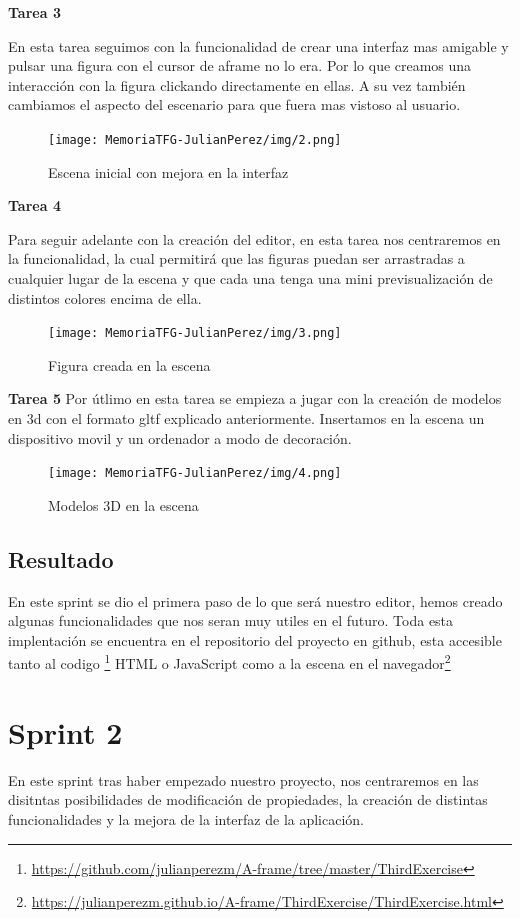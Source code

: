 \documentclass[a4paper, 12pt]{book}
\begin{document}
\textbf{Tarea 3}

En esta tarea seguimos con la funcionalidad de crear una interfaz mas amigable y pulsar una figura con el cursor de aframe no lo era. Por lo que creamos una interacción con la figura clickando directamente en ellas. A su vez también cambiamos el aspecto del escenario para que fuera mas vistoso al usuario.
         \begin{figure}[H]
  \centering
  \texttt{[image: MemoriaTFG-JulianPerez/img/2.png]}
  \caption{Escena inicial con mejora en la interfaz}\label{scrum}
\end{figure}

\textbf{Tarea 4}

Para seguir adelante con la creación del editor, en esta tarea nos centraremos en la funcionalidad, la cual permitirá que las figuras puedan ser arrastradas a cualquier lugar de la escena y que cada una tenga una mini previsualización de distintos colores encima de ella.          \begin{figure}[H]
  \centering
  \texttt{[image: MemoriaTFG-JulianPerez/img/3.png]}
  \caption{Figura creada en la escena}\label{scrum}
\end{figure}

\textbf{Tarea 5}
Por útlimo en esta tarea se empieza a jugar con la creación de modelos en 3d con el formato gltf explicado anteriormente. Insertamos en la escena un dispositivo movil y un ordenador a modo de decoración.
\begin{figure}[H]
  \centering
  \texttt{[image: MemoriaTFG-JulianPerez/img/4.png]}
  \caption{Modelos 3D en la escena}\label{scrum}
\end{figure}

\subsection{Resultado}
En este sprint se dio el primera paso de lo que será nuestro editor, hemos creado algunas funcionalidades que nos seran muy utiles en el futuro. Toda esta implentación se encuentra en el repositorio del proyecto en github, esta accesible tanto al codigo \footnote{\url{https://github.com/julianperezm/A-frame/tree/master/ThirdExercise}}
 HTML o JavaScript como a la escena en el navegador\footnote{\url{https://julianperezm.github.io/A-frame/ThirdExercise/ThirdExercise.html}}

\section{Sprint 2}
En este sprint tras haber empezado nuestro proyecto, nos centraremos en las disitntas posibilidades de modificación de propiedades, la creación de distintas  funcionalidades y la mejora de la interfaz de la aplicación.
\end{document}
